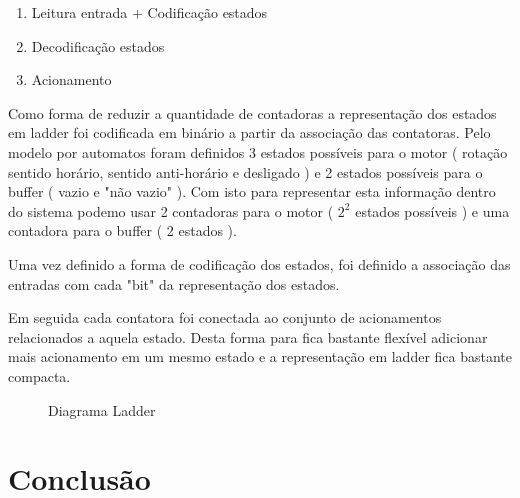\documentclass[a4paper,11pt]{article}
\begin{document}
\begin{enumerate}
    \item Leitura entrada + Codificação estados
    \item Decodificação estados
    \item Acionamento
\end{enumerate}

Como forma de reduzir a quantidade de contadoras a representação dos estados em ladder foi codificada em binário a partir da associação das contatoras. Pelo modelo por automatos foram definidos 3 estados possíveis para o motor ( rotação sentido horário, sentido anti-horário e desligado ) e 2 estados possíveis para o buffer ( vazio e "não vazio" ). Com isto para representar esta informação dentro do sistema podemo usar 2 contadoras para o motor ( $2^2$ estados possíveis ) e uma contadora para o buffer ( 2 estados ).

Uma vez definido a forma de codificação dos estados, foi definido a associação das entradas com cada "bit" da representação dos estados.

Em seguida cada contatora foi conectada ao conjunto de acionamentos relacionados a aquela estado. Desta forma para fica bastante flexível adicionar mais acionamento em um mesmo estado e a representação em ladder fica bastante compacta.

\begin{figure}[H]
    \centering
    
    \caption{Diagrama Ladder}
    \label{fig:my_label}
\end{figure}

\section{Conclusão}

\newpage


\end{document}
